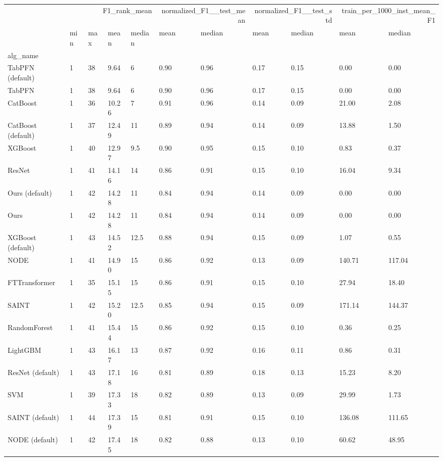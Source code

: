 \begin{tabular}{lllllllllll}
\toprule
 & \multicolumn{4}{r}{F1_rank_mean} & \multicolumn{2}{r}{normalized_F1__test_mean} & \multicolumn{2}{r}{normalized_F1__test_std} & \multicolumn{2}{r}{train_per_1000_inst_mean_F1} \\
 & min & max & mean & median & mean & median & mean & median & mean & median \\
alg_name &  &  &  &  &  &  &  &  &  &  \\
\midrule
TabPFN (default) & 1 & 38 & 9.64 & 6 & 0.90 & 0.96 & 0.17 & 0.15 & 0.00 & 0.00 \\
TabPFN & 1 & 38 & 9.64 & 6 & 0.90 & 0.96 & 0.17 & 0.15 & 0.00 & 0.00 \\
CatBoost & 1 & 36 & 10.26 & 7 & 0.91 & 0.96 & 0.14 & 0.09 & 21.00 & 2.08 \\
CatBoost (default) & 1 & 37 & 12.49 & 11 & 0.89 & 0.94 & 0.14 & 0.09 & 13.88 & 1.50 \\
XGBoost & 1 & 40 & 12.97 & 9.5 & 0.90 & 0.95 & 0.15 & 0.10 & 0.83 & 0.37 \\
ResNet & 1 & 41 & 14.16 & 14 & 0.86 & 0.91 & 0.15 & 0.10 & 16.04 & 9.34 \\
Ours (default) & 1 & 42 & 14.28 & 11 & 0.84 & 0.94 & 0.14 & 0.09 & 0.00 & 0.00 \\
Ours & 1 & 42 & 14.28 & 11 & 0.84 & 0.94 & 0.14 & 0.09 & 0.00 & 0.00 \\
XGBoost (default) & 1 & 43 & 14.52 & 12.5 & 0.88 & 0.94 & 0.15 & 0.09 & 1.07 & 0.55 \\
NODE & 1 & 41 & 14.90 & 15 & 0.86 & 0.92 & 0.13 & 0.09 & 140.71 & 117.04 \\
FTTransformer & 1 & 35 & 15.15 & 15 & 0.86 & 0.91 & 0.15 & 0.10 & 27.94 & 18.40 \\
SAINT & 1 & 42 & 15.20 & 12.5 & 0.85 & 0.94 & 0.15 & 0.09 & 171.14 & 144.37 \\
RandomForest & 1 & 41 & 15.44 & 15 & 0.86 & 0.92 & 0.15 & 0.10 & 0.36 & 0.25 \\
LightGBM & 1 & 43 & 16.17 & 13 & 0.87 & 0.92 & 0.16 & 0.11 & 0.86 & 0.31 \\
ResNet (default) & 1 & 43 & 17.18 & 16 & 0.81 & 0.89 & 0.18 & 0.13 & 15.23 & 8.20 \\
SVM & 1 & 39 & 17.33 & 18 & 0.82 & 0.89 & 0.13 & 0.09 & 29.99 & 1.73 \\
SAINT (default) & 1 & 44 & 17.39 & 15 & 0.81 & 0.91 & 0.15 & 0.10 & 136.08 & 111.65 \\
NODE (default) & 1 & 42 & 17.45 & 18 & 0.82 & 0.88 & 0.13 & 0.10 & 60.62 & 48.95 \\

\end{tabular}
